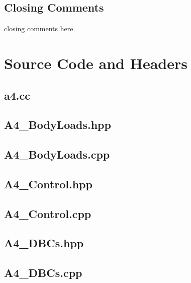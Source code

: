 \documentclass[a4paper, 12pt]{article}
\begin{document}
\subsection{Closing Comments} \label{sec:comments}
closing comments here.

\newpage
\appendix
\section{Source Code and Headers} \label{sec:code}

\newpage
\subsection{a4.cc} \label{subsec:a4.cc}


\newpage
\subsection{A4\_BodyLoads.hpp} \label{subsec:BLhpp}


\newpage
\subsection{A4\_BodyLoads.cpp} \label{subsec:BLcpp}


\newpage
\subsection{A4\_Control.hpp} \label{subsec:Cont.hpp}


\newpage
\subsection{A4\_Control.cpp} \label{subsec:Cont.cpp}


\newpage
\subsection{A4\_DBCs.hpp} \label{subsec:DBCs.hpp}


\newpage
\subsection{A4\_DBCs.cpp} \label{subsec:DBCs.cpp}

\end{document}
